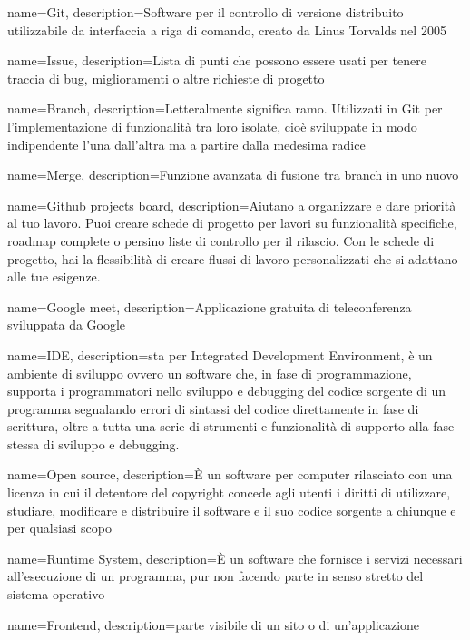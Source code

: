 {
	name={Git},
	description={Software per il controllo di versione distribuito utilizzabile da interfaccia a riga di comando, creato da Linus Torvalds nel 2005}
}

{
	name={Issue},
	description={Lista di punti che possono essere usati per tenere traccia di bug, miglioramenti o altre richieste di progetto}
}

{
	name={Branch},
	description={Letteralmente significa ramo. Utilizzati in Git per l'implementazione di funzionalità tra loro isolate, cioè sviluppate in modo indipendente l'una dall'altra ma a partire dalla medesima radice}
}

{
	name={Merge},
	description={Funzione avanzata di fusione tra branch in uno nuovo}
}

{
	name={Github projects board},
	description={Aiutano a organizzare e dare priorità al tuo lavoro. Puoi creare schede di progetto per lavori su funzionalità specifiche, roadmap complete o persino liste di controllo per il rilascio. Con le schede di progetto, hai la flessibilità di creare flussi di lavoro personalizzati che si adattano alle tue esigenze.}
}

{
	name={Google meet},
	description={Applicazione gratuita di teleconferenza sviluppata da Google}
}

{
	name={IDE},
	description={sta per Integrated Development Environment, è un ambiente di sviluppo ovvero un software che, in fase di programmazione, supporta i programmatori nello sviluppo e debugging del codice sorgente di un programma segnalando errori di sintassi del codice direttamente in fase di scrittura, oltre a tutta una serie di strumenti e funzionalità di supporto alla fase stessa di sviluppo e debugging.}
}

{
	name={Open source},
	description={È un software per computer rilasciato con una licenza in cui il detentore del copyright concede agli utenti i diritti di utilizzare, studiare, modificare e distribuire il software e il suo codice sorgente a chiunque e per qualsiasi scopo}
}

{
	name={Runtime System},
	description={È un software che fornisce i servizi necessari all'esecuzione di un programma, pur non facendo parte in senso stretto del sistema operativo}
}

{
	name={Frontend},
	description={parte visibile di un sito o di un'applicazione}
}

